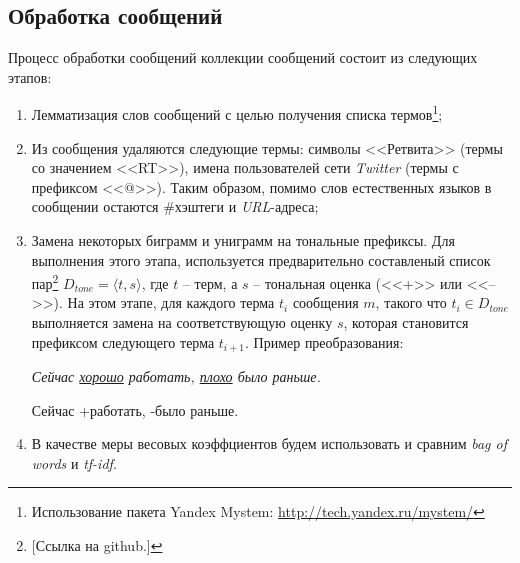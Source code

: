     \subsection{Обработка сообщений}
    \label{sec:buildingMsgProcessing}
    Процесс обработки сообщений коллекции сообщений состоит из следующих этапов:
    \begin{enumerate}
        \item Лемматизация слов сообщений с целью получения списка термов\footnote{
            Использование пакета Yandex Mystem:
            \url{http://tech.yandex.ru/mystem/}
        };

        \item Из сообщения удаляются следующие термы:
            символы <<Ретвита>> (термы со значением <<RT>>),
            имена пользователей сети {\it Twitter} (термы с префиксом <<@>>).
            Таким образом, помимо слов естественных языков в сообщении остаются
            \#хэштеги и {\it URL\hspace{1pt}}-адреса;
        \item Замена некоторых биграмм и униграмм на тональные префиксы.
            Для выполнения этого этапа, используется предварительно составленый
            список пар\footnote{
                [Ссылка на github.]
            }
            $D_{tone} = {\langle t, s\rangle}$, где $t$ -- терм, а $s$ --
            тональная оценка (<<+>> или <<-->>). На этом этапе, для каждого терма $t_i$
            сообщения $m$, такого что $t_i \in D_{tone}$ выполняется замена на соответствующую
            оценку $s$, которая становится префиксом следующего терма $t_{i+1}$.
            Пример преобразования:
            \begin{center}
                \it
                Сейчас \underline{хорошо} работать, \underline{плохо} было раньше.

                Сейчас +работать, -было раньше.
            \end{center}
        \item В качестве меры весовых коэффциентов будем использовать и сравним
            {\it bag of words} и {\it tf-idf}.
    \end{enumerate}

